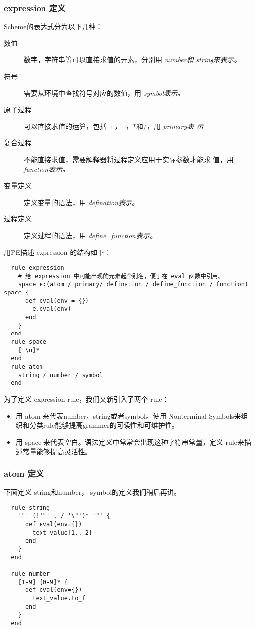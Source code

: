 \documentclass{article}
\begin{document}
\subsubsection{expression 定义}
Scheme的表达式分为以下几种：
\begin{description}
\item[数值]数字，字符串等可以直接求值的元素，分别用 \em{number}和
  \em{string}来表示。
\item[符号]需要从环境中查找符号对应的数值，用 \em{symbol}表示。
\item[原子过程]可以直接求值的运算，包括 +， -，*和/，用 \em{primary}表
  示

\item[复合过程]不能直接求值，需要解释器将过程定义应用于实际参数才能求
  值，用
  \em{function}表示。
\item[变量定义] 定义变量的语法，用 \em{defination}表示。
\item[过程定义] 定义过程的语法，用 \em{define\_function}表示。
\end{description}
用PE描述 expression 的结构如下：

\begin{verbatim}
  rule expression
    # 给 expression 中可能出现的元素起个别名，便于在 eval 函数中引用。
    space e:(atom / primary/ defination / define_function / function) space {
      def eval(env = {})
        e.eval(env)
      end
    }
  end
  rule space
    [ \n]*
  end
  rule atom
    string / number / symbol
  end

\end{verbatim}
为了定义 expression rule，我们又新引入了两个 rule：
\begin{itemize}
\item 用 atom 来代表number，string或者symbol。使用 Nonterminal
Symbols来组织和分类rule能够提高grammer的可读性和可维护性。
\item 用 space 来代表空白。语法定义中常常会出现这种字符串常量，定义
  rule来描述常量能够提高灵活性。
\end{itemize}

\subsubsection{atom 定义}
下面定义 string和number， symbol的定义我们稍后再讲。
\begin{verbatim}
  rule string
    '"' (!'"' . / '\"')* '"' {
      def eval(env={})
        text_value[1..-2]
      end
    }
  end

  rule number
    [1-9] [0-9]* {
      def eval(env={})
        text_value.to_f
      end
    }
  end

\end{verbatim}
\end{document}

